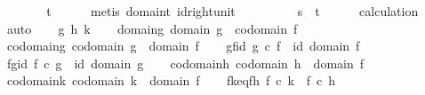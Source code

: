 \begin{isabellebody}
\ \ \isamarkupfalse%
\ \isamarkupfalse%
\ {\isachardoublequoteopen}{\isachardot}{\kern0pt}{\isachardot}{\kern0pt}{\isachardot}{\kern0pt}\ {\isacharequal}{\kern0pt}\ t{\isachardoublequoteclose}\isanewline
\ \ \ \ \isamarkupfalse%
\ {\isacharparenleft}{\kern0pt}metis\ domain{\isacharunderscore}{\kern0pt}t\ id{\isacharunderscore}{\kern0pt}right{\isacharunderscore}{\kern0pt}unit{\isacharparenright}{\kern0pt}\ \ \ \ \isanewline
\ \ \isamarkupfalse%
\ \isamarkupfalse%
\ {\isachardoublequoteopen}s\ {\isacharequal}{\kern0pt}\ t{\isachardoublequoteclose}\isanewline
\ \ \ \ \isamarkupfalse%
\ calculation\ \isamarkupfalse%
\ auto\isanewline
{}\isamarkupfalse%
\isanewline
\ \ \isamarkupfalse%
\ g\ h\ k\isanewline
\ \ \isamarkupfalse%
\ domain{\isacharunderscore}{\kern0pt}g{\isacharcolon}{\kern0pt}\ {\isachardoublequoteopen}domain\ g\ {\isacharequal}{\kern0pt}\ codomain\ f{\isachardoublequoteclose}\isanewline
\ \ \isamarkupfalse%
\ codomain{\isacharunderscore}{\kern0pt}g{\isacharcolon}{\kern0pt}\ {\isachardoublequoteopen}codomain\ g\ {\isacharequal}{\kern0pt}\ domain\ f{\isachardoublequoteclose}\isanewline
\ \ \isamarkupfalse%
\ gf{\isacharunderscore}{\kern0pt}id{\isacharcolon}{\kern0pt}\ {\isachardoublequoteopen}g\ {\isasymcirc}\isactrlsub c\ f\ {\isacharequal}{\kern0pt}\ id\ {\isacharparenleft}{\kern0pt}domain\ f{\isacharparenright}{\kern0pt}{\isachardoublequoteclose}\isanewline
\ \ \isamarkupfalse%
\ fg{\isacharunderscore}{\kern0pt}id{\isacharcolon}{\kern0pt}\ {\isachardoublequoteopen}f\ {\isasymcirc}\isactrlsub c\ g\ {\isacharequal}{\kern0pt}\ id\ {\isacharparenleft}{\kern0pt}domain\ g{\isacharparenright}{\kern0pt}{\isachardoublequoteclose}\isanewline
\ \ \isamarkupfalse%
\ codomain{\isacharunderscore}{\kern0pt}h{\isacharcolon}{\kern0pt}\ {\isachardoublequoteopen}codomain\ h\ {\isacharequal}{\kern0pt}\ domain\ f{\isachardoublequoteclose}\isanewline
\ \ \isamarkupfalse%
\ codomain{\isacharunderscore}{\kern0pt}k{\isacharcolon}{\kern0pt}\ {\isachardoublequoteopen}codomain\ k\ {\isacharequal}{\kern0pt}\ domain\ f{\isachardoublequoteclose}\isanewline
\ \ \isamarkupfalse%
\ fk{\isacharunderscore}{\kern0pt}eq{\isacharunderscore}{\kern0pt}fh{\isacharcolon}{\kern0pt}\ {\isachardoublequoteopen}f\ {\isasymcirc}\isactrlsub c\ k\ {\isacharequal}{\kern0pt}\ f\ {\isasymcirc}\isactrlsub c\ h{\isachardoublequoteclose}\isanewline

\end{isabellebody}
